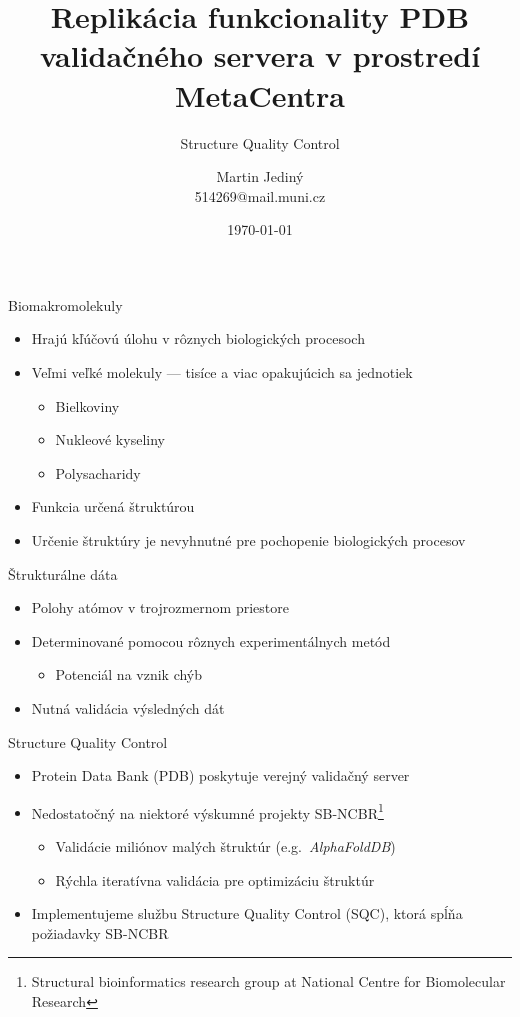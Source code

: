 \documentclass[
  aspectratio=169,
]{beamer}
\title[Structure Quality Control]{Replikácia funkcionality PDB validačného servera v prostredí MetaCentra}
\subtitle[Alternatívny názov prezentácie]{Structure Quality Control}
\author[M.\, Jediný]{Martin Jediný\texorpdfstring{\\}{, }514269@mail.muni.cz}
\institute[FI MU]{Fakulta informatiky Masarykovej univerzity}
\date{\today}
\begin{document}
\begin{frame}[plain]
\maketitle
\end{frame}

\begin{frame}{Biomakromolekuly}
\begin{itemize}
  \item Hrajú kľúčovú úlohu v rôznych biologických procesoch
  \item Veľmi veľké molekuly --- tisíce a viac opakujúcich sa jednotiek
  \begin{itemize}
    \item Bielkoviny
    \item Nukleové kyseliny
    \item Polysacharidy
  \end{itemize}
  \item Funkcia určená štruktúrou
  \item Určenie štruktúry je nevyhnutné pre pochopenie biologických procesov
\end{itemize}
\end{frame}

\begin{frame}{Štrukturálne dáta}
\begin{itemize}
  \item Polohy atómov v trojrozmernom priestore
  \item Determinované pomocou rôznych experimentálnych metód
  \begin{itemize}
    \item Potenciál na vznik chýb
  \end{itemize}
  \item Nutná validácia výsledných dát
\end{itemize}
\end{frame}

\begin{frame}{Structure Quality Control}
\begin{itemize}
  \item Protein Data Bank (PDB) poskytuje verejný validačný server 
  \item Nedostatočný na niektoré výskumné projekty SB-NCBR\footnote{Structural bioinformatics research group at National Centre for Biomolecular Research}
  \begin{itemize}
    \item Validácie miliónov malých štruktúr (e.g.\ \emph{AlphaFoldDB})
    \item Rýchla iteratívna validácia pre optimizáciu štruktúr
  \end{itemize}
  \item Implementujeme službu Structure Quality Control (SQC), ktorá spĺňa požiadavky SB-NCBR
\end{itemize}
\end{frame}
\end{document}
